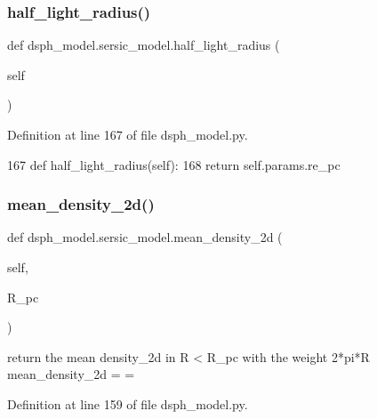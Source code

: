 \subsubsection{\texorpdfstring{half\+\_\+light\+\_\+radius()}{half\_light\_radius()}}
{\footnotesize\ttfamily def dsph\+\_\+model.\+sersic\+\_\+model.\+half\+\_\+light\+\_\+radius (\begin{DoxyParamCaption}\item[{}]{self }\end{DoxyParamCaption})}



Definition at line 167 of file dsph\+\_\+model.\+py.


\begin{DoxyCode}
167     \textcolor{keyword}{def }half\_light\_radius(self):
168         \textcolor{keywordflow}{return} self.params.re\_pc
\end{DoxyCode}
\mbox{\label{classdsph__model_1_1sersic__model_a52fb76f30a58833cc14b3c9878ac9b56}} 
\subsubsection{\texorpdfstring{mean\+\_\+density\+\_\+2d()}{mean\_density\_2d()}}
{\footnotesize\ttfamily def dsph\+\_\+model.\+sersic\+\_\+model.\+mean\+\_\+density\+\_\+2d (\begin{DoxyParamCaption}\item[{}]{self,  }\item[{}]{R\+\_\+pc }\end{DoxyParamCaption})}

\begin{DoxyVerb}return the mean density_2d in R < R_pc with the weight 2*pi*R
mean_density_2d = 
    = 
\end{DoxyVerb}
 

Definition at line 159 of file dsph\+\_\+model.\+py.


